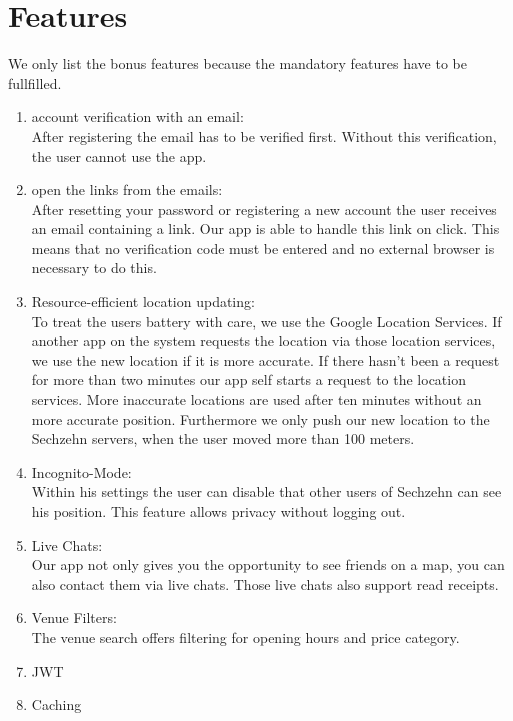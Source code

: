 \documentclass[11pt, accentcolor=tud1c]{tudreport}
\begin{document}
\section{Features}
We only list the bonus features because the mandatory features have to be fullfilled.
\begin{enumerate}
\item account verification with an email: \\
After registering the email has to be verified first. Without this verification, the user cannot use the app.
\item open the links from the emails: \\
After resetting your password or registering a new account the user receives an email containing a link. Our app is able to handle this link on click. This means that no verification code must be entered and no external browser is necessary to do this.
\item Resource-efficient location updating: \\
To treat the users battery with care, we use the Google Location Services. If another app on the system requests the location via those location services, we use the new location if it is more accurate. If there hasn't been a request for more than two minutes our app self starts a request to the location services. More inaccurate locations are used after ten minutes without an more accurate position. Furthermore we only push our new location to the Sechzehn servers, when the user moved more than 100 meters. 
\item Incognito-Mode: \\
Within his settings the user can disable that other users of Sechzehn can see his position. This feature allows privacy without logging out.
\item Live Chats: \\
Our app not only gives you the opportunity to see friends on a map, you can also contact them via live chats. Those live chats also support read receipts.
\item Venue Filters: \\
The venue search offers filtering for opening hours and price category.
\item JWT
\item Caching
\end{enumerate}
\end{document}
